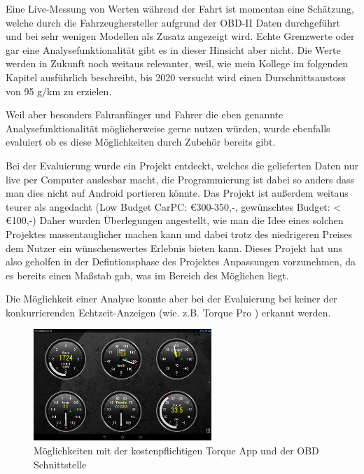 Eine Live-Messung von  Werten während der Fahrt ist momentan eine Schätzung, welche durch die Fahrzeughersteller aufgrund der OBD-II Daten durchgeführt und bei sehr wenigen Modellen als Zusatz angezeigt wird. Echte Grenzwerte oder gar eine Analysefunktionalität gibt es in dieser Hinsicht aber nicht. Die  Werte werden in Zukunft noch weitaus relevanter, weil, wie mein Kollege im folgenden Kapitel ausführlich beschreibt, bis 2020 versucht wird einen Durschnittsaustoss von 95 g/km zu erzielen. \cite{SIMR.CH1-Fahrstil_Analyse.EUVerordCO2}

Weil aber besonders Fahranfänger und Fahrer die eben genannte Analysefunktionalität möglicherweise gerne nutzen würden, wurde ebenfalls evaluiert ob es diese Möglichkeiten durch Zubehör bereits gibt.

Bei der Evaluierung wurde ein Projekt entdeckt, welches die gelieferten Daten nur live per Computer auslesbar macht, die Programmierung ist dabei so anders dass man dies nicht auf Android portieren könnte. Das Projekt ist außerdem weitaus teurer als angedacht (Low Budget CarPC: €300-350,-, gewünschtes Budget: < €100,-) Daher wurden Überlegungen angestellt, wie man die Idee eines solchen Projektes massentauglicher machen kann und dabei trotz des niedrigeren Preises dem Nutzer ein wünschenswertes Erlebnis bieten kann. \cite{SIMR.CH1-Fahrstil-Analyse.LowBudgetCarPC} Dieses Projekt hat uns also geholfen in der Defintionsphase des Projektes Anpassungen vorzunehmen, da es bereits einen Maßstab gab, was im Bereich des Möglichen liegt.

Die Möglichkeit einer Analyse konnte aber bei der Evaluierung bei keiner der konkurrierenden Echtzeit-Anzeigen (wie. z.B. Torque Pro \cite{SIMR.CH1-Fahrstil-Analyse.TorquePro}) erkannt werden. 

\begin{figure}[!htb]\centering
	\includegraphics[width=0.6\textwidth]{images/torquePro}
	\caption{Möglichkeiten mit der kostenpflichtigen Torque App  und der OBD Schnittstelle \cite{SIMR.CH1-Fahrstil-Analyse.TorquePro}}\label{Fig:imgGTR}
\end{figure}

